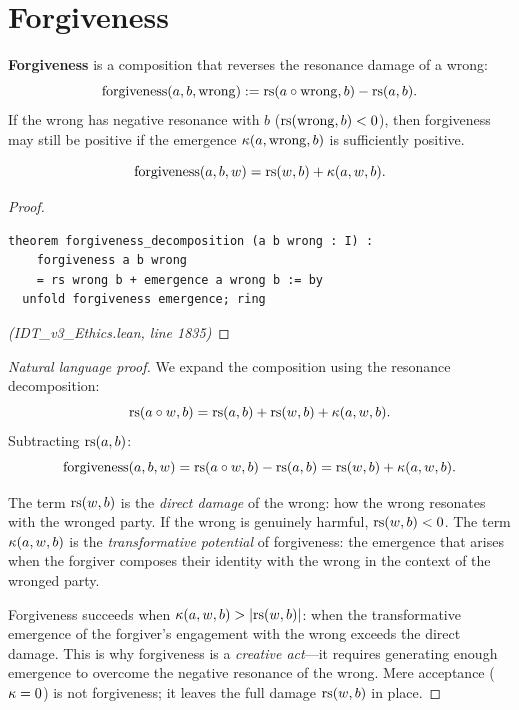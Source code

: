 \section{Forgiveness}
\label{sec:forgiveness}

\begin{definition}[Forgiveness]
\label{def:forgiveness}
\textbf{Forgiveness} is a composition that reverses the resonance damage
of a wrong:
\[
  \mathrm{forgiveness}(a, b, \mathrm{wrong}) := \mathrm{rs}(a \circ \mathrm{wrong}, b)
  - \mathrm{rs}(a, b).
\]
If the wrong has negative resonance with $b$ ($\mathrm{rs}(\mathrm{wrong}, b) < 0$),
then forgiveness may still be positive if the emergence
$\kappa(a, \mathrm{wrong}, b)$ is sufficiently positive.
\end{definition}

\begin{theorem}
\label{thm:forgiveness-decomp}
\[
  \mathrm{forgiveness}(a, b, w) = \mathrm{rs}(w, b) + \kappa(a, w, b).
\]
\end{theorem}

\begin{proof}
\begin{lstlisting}
theorem forgiveness_decomposition (a b wrong : I) :
    forgiveness a b wrong
    = rs wrong b + emergence a wrong b := by
  unfold forgiveness emergence; ring
\end{lstlisting}
\textit{(IDT\_v3\_Ethics.lean, line 1835)}
\end{proof}

\begin{proof}[Natural language proof]
We expand the composition using the resonance decomposition:
\[
  \mathrm{rs}(a \circ w, b) = \mathrm{rs}(a, b) + \mathrm{rs}(w, b) + \kappa(a, w, b).
\]
Subtracting $\mathrm{rs}(a, b)$:
\[
  \mathrm{forgiveness}(a, b, w) = \mathrm{rs}(a \circ w, b) - \mathrm{rs}(a, b)
  = \mathrm{rs}(w, b) + \kappa(a, w, b).
\]

The term $\mathrm{rs}(w, b)$ is the \emph{direct damage} of the wrong: how the
wrong resonates with the wronged party. If the wrong is genuinely harmful,
$\mathrm{rs}(w, b) < 0$. The term $\kappa(a, w, b)$ is the \emph{transformative
potential} of forgiveness: the emergence that arises when the forgiver
composes their identity with the wrong in the context of the wronged party.

Forgiveness succeeds when $\kappa(a, w, b) > |\mathrm{rs}(w, b)|$: when the
transformative emergence of the forgiver's engagement with the wrong exceeds
the direct damage. This is why forgiveness is a \emph{creative act}---it
requires generating enough emergence to overcome the negative resonance of
the wrong. Mere acceptance ($\kappa = 0$) is not forgiveness; it leaves
the full damage $\mathrm{rs}(w, b)$ in place.
\end{proof}


